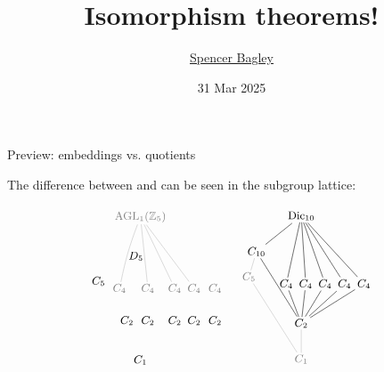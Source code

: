 \documentclass[8pt]{beamer}
\title[Isomorphism theorems!]{Isomorphism theorems!}
\author[\href{mailto:sbagley@westminsteru.edu}{S. Bagley}]
       {\href{mailto:sbagley@westminsteru.edu}{Spencer Bagley}}
\institute[Westminster] { 
  \normalsize With many thanks to Matthew Macauley, \\
  \url{http://www.math.clemson.edu/~macaule/}}
\date[31 Mar 2025]{31 Mar 2025}
\newcommand{\Pause}{}      %
\begin{document}
\frame{\titlepage}


\begin{frame}{Preview: embeddings vs. quotients} %

  The difference between  and  can be seen in the subgroup lattice:
  
  \vspace{-2mm}

  \[
  \begin{tikzpicture}[shorten >= -2pt, shorten <= -2pt,scale=.65]
    \tikzstyle{every node}=[font=\small]
    \begin{scope}[shift={(7,1.6)},scale=1.3,yscale=1.2]
      \node(Dic10) at (0,3) {$\Dic_{10}$};
      \node(r) at (-1.5,2) {$C_{10}$};
      \node(s) at (-.5,1.1) {$C_4$}; 
      \node(rs) at (.15,1.1) {$C_4$}; 
      \node(r2s) at (.8,1.1) {$C_4$}; 
      \node(r3s) at (1.45,1.1) {$C_4$};
      \node(r4s) at (2.1,1.1) {$C_4$};
      \node (r5) at (0,0) {$C_2$};
      \node (r2) at (-1.75,1.3) {\color{midgray}$C_5$};
      \node (1) at (0,-1) {\color{midgray}$C_1$};
      \draw (Dic10) to (r); \draw (r) to (r5);
      \draw (Dic10) to (s); \draw (Dic10) to (rs); 
      \draw (Dic10) to (r2s); \draw (Dic10) to (r3s); \draw (Dic10) to (r4s);
      \draw (r5) to (s); \draw (r5) to (rs); \draw (r5) to (r2s);
      \draw (r5) to (r3s); \draw (r5) to (r4s);
      \draw[faded] (1) to (r5); \draw[faded] (1) to (r2); 
      \draw[faded] (r) to (r2); 
    \end{scope}
    \begin{scope}[shift={(0,0)},scale=1.3,yscale=1.2]
      \node (Fr20) at (0,4) {\color{midgray}$\AGL_1(\Z_5)$};
      \node(s2-t) at (-.15,2.9) {$D_5$};
      \node (t) at (-1.4,2.2) {$C_5$};
      \node (s) at (-.7,2) {\color{midgray}$C_4$};
      \node (st) at (.25,2) {\color{midgray}$C_4$};
      \node (s3t) at (1.15,2) {\color{midgray}$C_4$};
      \node (ts) at (1.8,2) {\color{midgray}$C_4$};
      \node (ts3) at (2.5,2) {\color{midgray}$C_4$};
      \node(s2) at (-.45,1.1) {$C_2$}; 
      \node(ts2) at (.25,1.1) {$C_2$}; 
      \node(sts) at (1.15,1.1) {$C_2$}; 
      \node(s2t2) at (1.8,1.1) {$C_2$};
      \node(s2t) at (2.5,1.1) {$C_2$};
      \node (1) at (0,0) {$C_1$};
      \draw[bend right=5,faded] (Fr20) to (s); 
      \draw[faded] (Fr20) to (st); 
      \draw[faded] (Fr20) to (s3t);
      \draw[faded] (Fr20) to (ts); 

\end{scope}
\end{tikzpicture}\]
\end{frame}
\end{document}
